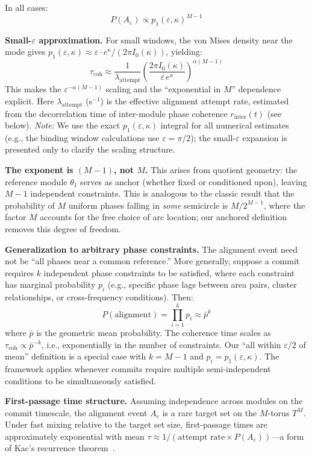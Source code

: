 \documentclass[12pt]{article}
\begin{document}
In all cases:
\begin{equation}\label{eq:coh-mises}
P(A_\varepsilon) \propto p_1(\varepsilon, \kappa)^{M-1}
\end{equation}

\textbf{Small-$\varepsilon$ approximation.} For small windows, the von Mises density near the mode gives $p_1(\varepsilon, \kappa) \approx \varepsilon \cdot e^\kappa / (2\pi I_0(\kappa))$, yielding:
\[
\tau_{\mathrm{coh}} \approx \frac{1}{\lambda_{\mathrm{attempt}}} \left( \frac{2\pi I_0(\kappa)}{\varepsilon \, e^\kappa} \right)^{\alpha(M-1)}
\]
This makes the $\varepsilon^{-\alpha(M-1)}$ scaling and the ``exponential in $M$'' dependence explicit. Here $\lambda_{\mathrm{attempt}}$ (s$^{-1}$) is the effective alignment attempt rate, estimated from the decorrelation time of inter-module phase coherence $r_{\mathrm{inter}}(t)$ (see below). \emph{Note:} We use the exact $p_1(\varepsilon, \kappa)$ integral for all numerical estimates (e.g., the binding window calculations use $\varepsilon = \pi/2$); the small-$\varepsilon$ expansion is presented only to clarify the scaling structure.

\textbf{The exponent is $(M-1)$, not $M$.} This arises from quotient geometry: the reference module $\theta_1$ serves as anchor (whether fixed or conditioned upon), leaving $M-1$ independent constraints. This is analogous to the classic result that the probability of $M$ uniform phases falling in \emph{some} semicircle is $M/2^{M-1}$, where the factor $M$ accounts for the free choice of arc location; our anchored definition removes this degree of freedom.

\textbf{Generalization to arbitrary phase constraints.} The alignment event need not be ``all phases near a common reference.'' More generally, suppose a commit requires $k$ independent phase constraints to be satisfied, where each constraint has marginal probability $p_i$ (e.g., specific phase lags between area pairs, cluster relationships, or cross-frequency conditions). Then:
\[
P(\text{alignment}) = \prod_{i=1}^k p_i \approx \bar{p}^k
\]
where $\bar{p}$ is the geometric mean probability. The coherence time scales as $\tau_{\mathrm{coh}} \propto \bar{p}^{-k}$, i.e., exponentially in the number of constraints. Our ``all within $\varepsilon/2$ of mean'' definition is a special case with $k = M-1$ and $p_i = p_1(\varepsilon, \kappa)$. The framework applies whenever commits require multiple semi-independent conditions to be simultaneously satisfied.

\textbf{First-passage time structure.} Assuming independence across modules on the commit timescale, the alignment event $A_\varepsilon$ is a rare target set on the $M$-torus $T^M$. Under fast mixing relative to the target set size, first-passage times are approximately exponential with mean $\tau \approx 1/(\text{attempt rate} \times P(A_\varepsilon))$---a form of Kac's recurrence theorem~\cite{kac1947}.
\end{document}
